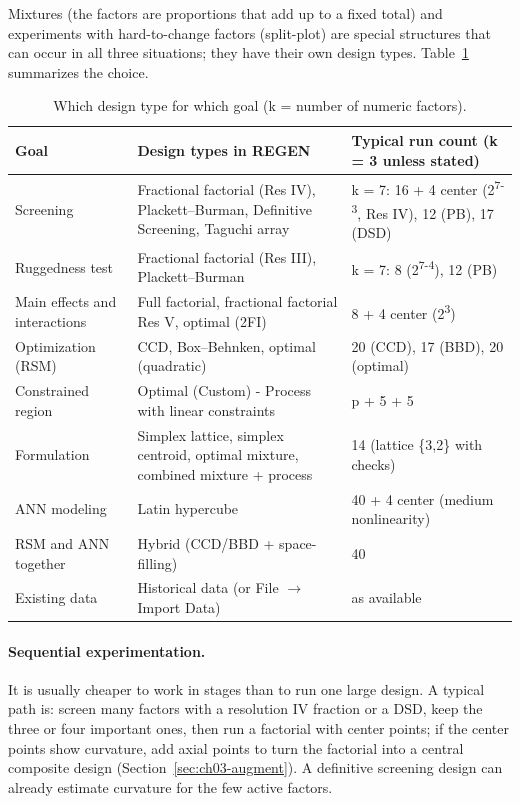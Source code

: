Mixtures (the factors are proportions that add up to a fixed total) and experiments with hard-to-change factors
(split-plot) are special structures that can occur in all three situations; they have their own design types.
Table~\ref{tab:ch03-choice} summarizes the choice.

\begin{table}[htbp]
\centering
\caption{Which design type for which goal (k = number of numeric factors).}
\label{tab:ch03-choice}
\small
\begin{tabularx}{\linewidth}{@{}p{3.3cm}p{4.6cm}X@{}}
\toprule
Goal & Design types in REGEN & Typical run count (k = 3 unless stated) \\
\midrule
Screening & Fractional factorial (Res IV), Plackett--Burman, Definitive Screening, Taguchi array &
  k = 7: 16 + 4 center (2\textsuperscript{7-3}, Res IV), 12 (PB), 17 (DSD) \\
Ruggedness test & Fractional factorial (Res III), Plackett--Burman & k = 7: 8 (2\textsuperscript{7-4}), 12 (PB) \\
Main effects and interactions & Full factorial, fractional factorial Res V, optimal (2FI) & 8 + 4 center (2\textsuperscript{3}) \\
Optimization (RSM) & CCD, Box--Behnken, optimal (quadratic) & 20 (CCD), 17 (BBD), 20 (optimal) \\
Constrained region & Optimal (Custom) - Process with linear constraints & p + 5 + 5 \\
Formulation & Simplex lattice, simplex centroid, optimal mixture, combined mixture + process & 14 (lattice \{3,2\} with checks) \\
ANN modeling & Latin hypercube & 40 + 4 center (medium nonlinearity) \\
RSM and ANN together & Hybrid (CCD/BBD + space-filling) & 40 \\
Existing data & Historical data (or File $\rightarrow$ Import Data) & as available \\
\bottomrule
\end{tabularx}
\end{table}

\paragraph{Sequential experimentation.} It is usually cheaper to work in stages than to run one large design. A
typical path is: screen many factors with a resolution IV fraction or a DSD, keep the three or four important ones,
then run a factorial with center points; if the center points show curvature, add axial points to turn the
factorial into a central composite design (Section~\ref{sec:ch03-augment}). A definitive screening design can
already estimate curvature for the few active factors.

